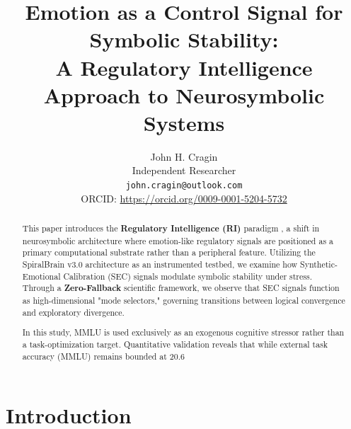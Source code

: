 \documentclass[11pt]{article}
\begin{document}
\title{Emotion as a Control Signal for Symbolic Stability: \\
\large A Regulatory Intelligence Approach to Neurosymbolic Systems}

\author{
John H. Cragin\\
Independent Researcher\\
\texttt{john.cragin@outlook.com}\\
ORCID: \url{https://orcid.org/0009-0001-5204-5732}
}

\maketitle

\begin{abstract}
This paper introduces the \textbf{Regulatory Intelligence (RI)} paradigm \cite{Cragin2026Thesis}, a shift in neurosymbolic architecture where emotion-like regulatory signals are positioned as a primary computational substrate rather than a peripheral feature. Utilizing the SpiralBrain v3.0 architecture \cite{SpiralBrainV3} as an instrumented testbed, we examine how Synthetic-Emotional Calibration (SEC) signals \cite{Cragin2026SEC} modulate symbolic stability under stress. Through a \textbf{Zero-Fallback} scientific framework, we observe that SEC signals function as high-dimensional "mode selectors," governing transitions between logical convergence and exploratory divergence.

In this study, MMLU is used exclusively as an exogenous cognitive stressor rather than a task-optimization target. Quantitative validation reveals that while external task accuracy (MMLU) remains bounded at 20.6%
\end{abstract}

\section{Introduction}
\end{document}
